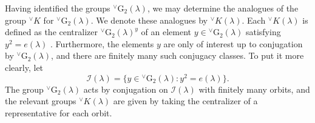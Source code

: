 \documentclass[a4paper, 11pt]{article}
\begin{document}
Having identified the groups ${^\vee}\mathrm{G}_{2}(\lambda)$, we may
determine the analogues of the group ${^\vee}K$ for 
${^\vee}\mathrm{G}_{2}(\lambda)$.  We denote these analogues by
${^\vee}K(\lambda)$.  Each ${^\vee}K(\lambda)$ is defined as the
centralizer ${^\vee}\mathrm{G}_{2}(\lambda)^{y}$ of an
element $y \in {^\vee}\mathrm{G}_{2}(\lambda)$ satisfying
$y^{2} = e(\lambda)$ \cite[Propositions 6.13 and 6.16]{ABV}.
Furthermore, the
elements $y$  are only of interest up to conjugation by
${^\vee}\mathrm{G}_{2}(\lambda)$, and there are finitely many such
conjugacy classes.  To put it more clearly, let
$$\mathcal{I}(\lambda) = \{y \in  {^\vee}\mathrm{G}_{2}(\lambda) :
y^{2} = e(\lambda)\}.$$
The group ${^\vee}\mathrm{G}_{2}(\lambda)$ acts by conjugation on
$\mathcal{I}(\lambda)$ with finitely many orbits, and the relevant groups
${^\vee}K(\lambda)$ are given by taking the centralizer of a representative
for each orbit.  
\end{document}
